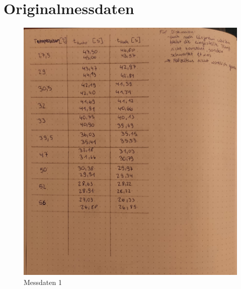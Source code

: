 \section{Originalmessdaten}
\label{Anhang}

\begin{figure}[H]
    \centering
    \includegraphics[width=1\textwidth]{content/Messdaten1.jpeg}
    \caption{Messdaten 1}
    \label{fig:plot}
\end{figure}

